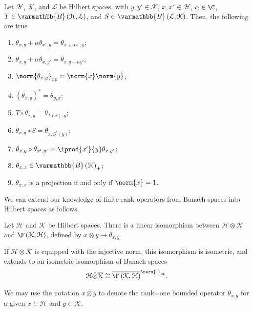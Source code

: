 \documentclass[10pt]{mypackage}
\renewcommand*{\mathbb}[1]{\varmathbb{#1}}
\newcommand{\B}{\mathbb{B}}
\begin{document}
\begin{proposition}
  Let $\mathcal{H}$, $\mathcal{K}$, and $\mathcal{L}$ be Hilbert spaces, with $y,y'\in \mathcal{K}$, $x,x'\in \mathcal{H}$, $\alpha \in \C$, $T\in \B\left(\mathcal{H},\mathcal{L}\right)$, and $S\in \B\left(\mathcal{L},\mathcal{K}\right)$. Then, the following are true
  \begin{enumerate}[(1)]
    \item $\theta_{x,y} + \alpha \theta_{x',y} = \theta_{x + \alpha x',y}$;
    \item $\theta_{x,y} + \overline{\alpha}\theta_{x,y'} = \theta_{x,y + \alpha y'}$;
    \item $\norm{\theta_{x,y}}_{\text{op}} = \norm{x}\norm{y}$;
    \item $\left(\theta_{x,y}\right)^{\ast} = \theta_{y,x}$;
    \item $T\circ \theta_{x,y} = \theta_{T\left(x\right),y}$;
    \item $\theta_{x,y}\circ S = \theta_{x,S^{\ast}\left(y\right)}$;
    \item $\theta_{x,y}\circ \theta_{x',y'} = \iprod{x'}{y}\theta_{x,y'}$;
    \item $\theta_{x,x}\in \B\left(\mathcal{H}\right)_{+}$;
    \item $\theta_{x,x}$ is a projection if and only if $\norm{x} = 1$.
  \end{enumerate}
\end{proposition}
We can extend our knowledge of finite-rank operators from Banach spaces into Hilbert spaces as follows.
\begin{corollary}
  Let $\mathcal{H}$ and $\mathcal{K}$ be Hilbert spaces. There is a linear isomorphism between $\mathcal{H}\otimes \overline{\mathcal{K}}$ and $\F\left(\mathcal{K},\mathcal{H}\right)$, defined by $x\otimes \overline{y} \mapsto \theta_{x,y}$.\newline

  If $\mathcal{H}\otimes \overline{\mathcal{K}}$ is equipped with the injective norm, this isomorphism is isometric, and extends to an isometric isomorphism of Banach spaces
  \begin{align*}
    \mathcal{H}\check{\otimes}\overline{\mathcal{K}} \cong \overline{\F\left(\mathcal{K},\mathcal{H}\right)}^{\norm{\cdot}_{\text{op}}}.
  \end{align*}
\end{corollary}
We may use the notation $x\otimes \overline{y}$ to denote the rank=one bounded operator $\theta_{x,y}$ for a given $x\in \mathcal{H}$ and $y\in \mathcal{K}$.
\end{document}
